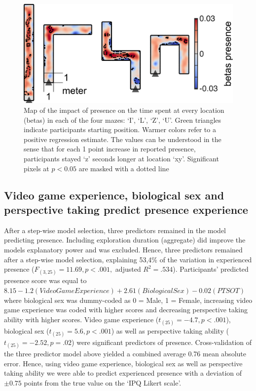\begin{figure}[h]
\centering
\includegraphics[width=\linewidth]{figures/head_loc_reg.pdf}
\caption{Map of the impact of presence on the time spent at every location (betas) in each of the four mazes: `I', `L', `Z', `U'. Green triangles indicate participants starting position. Warmer colors refer to a positive regression estimate. The values can be understood in the sense that for each 1 point increase in reported presence, participants stayed `z' seconds longer at location `xy'. Significant pixels at $p<0.05$ are masked with a dotted line}
\label{presence_head_loc}
\end{figure}

\subsection{Video game experience, biological sex and perspective taking predict presence experience}
After a step-wise model selection, three predictors remained in the model predicting presence. Including exploration duration (aggregate) did improve the models explanatory power and was excluded. Hence, three predictors remained after a step-wise model selection, explaining 53,4\% of the variation in experienced presence ($F_{(3,25)}=11.69, p < .001,$ adjusted $R^2=.534$). Participants' predicted presence score was equal to $8.15 - 1.2 (Video Game Experience) + 2.61 (Biological Sex) - 0.02 (PTSOT)$ where biological sex was dummy-coded as 0 = Male, 1 = Female, increasing video game experience was coded with higher scores and decreasing perspective taking ability with higher scores. Video game experience ($t_{(25)}=-4.7, p<.001$), biological sex ($t_{(25)}=5.6, p<.001$) as well as perspective taking ability ($t_{(25)}=-2.52, p=.02$) were significant predictors of presence. Cross-validation of the three predictor model above yielded a combined average 0.76 mean absolute error. Hence, using video game experience, biological sex as well as perspective taking ability we were able to predict experienced presence with a deviation of $\pm 0.75$ points from the true value on the `IPQ Likert scale'.